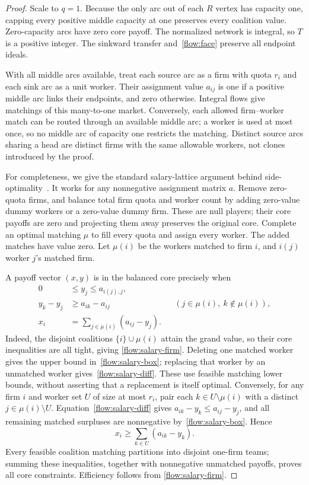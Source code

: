 \begin{proof}
Scale to $q=1$. Because the only arc out of each $R$ vertex has capacity
one, capping every positive middle capacity at one preserves every
coalition value. Zero-capacity arcs have zero core payoff. The normalized
network is integral, so $T$ is a positive integer. The sinkward transfer
and~\eqref{flow:face} preserve all endpoint ideals.

With all middle arcs available, treat each source arc as a firm with
quota $r_i$ and each sink arc as a unit worker. Their assignment value
$a_{ij}$ is one if a positive middle arc links their endpoints, and zero
otherwise. Integral flows give matchings of this many-to-one market.
Conversely, each allowed firm--worker match can be routed through an
available middle arc; a worker is used at most once, so no middle arc
of capacity one restricts the matching. Distinct source arcs sharing a
head are distinct firms with the same allowable workers, not clones
introduced by the proof.

For completeness, we give the standard salary-lattice argument behind
side-optimality~\cite{flow:AtayNunezSolymosi2026}. It works for any
nonnegative assignment matrix $a$. Remove zero-quota firms, and balance
total firm quota and worker count by adding zero-value dummy workers
or a zero-value dummy firm. These are null players; their core payoffs
are zero and projecting them away preserves the original core. Complete
an optimal matching $\mu$ to fill every quota and assign every worker.
The added matches have value zero. Let $\mu(i)$ be the workers matched
to firm $i$, and $i(j)$ worker $j$'s matched firm.

A payoff vector $(x,y)$ is in the balanced core precisely when
\begin{align}
 0&\le y_j\le a_{i(j),j},\label{flow:salary-box}\\
 y_k-y_j&\ge a_{ik}-a_{ij}
         &&(j\in\mu(i),\ k\notin\mu(i)),\label{flow:salary-diff}\\
 x_i&=\sum_{j\in\mu(i)}(a_{ij}-y_j).\label{flow:salary-firm}
\end{align}
Indeed, the disjoint coalitions $\{i\}\cup\mu(i)$ attain the grand
value, so their core inequalities are all tight, giving
\eqref{flow:salary-firm}. Deleting one matched worker gives the upper
bound in~\eqref{flow:salary-box}; replacing that worker by an unmatched
worker gives~\eqref{flow:salary-diff}. These use feasible matching
lower bounds, without asserting that a replacement is itself optimal.
Conversely, for any firm $i$ and worker set $U$ of size at most $r_i$,
pair each $k\in U\setminus\mu(i)$ with a distinct
$j\in\mu(i)\setminus U$. Equation~\eqref{flow:salary-diff} gives
$a_{ik}-y_k\le a_{ij}-y_j$, and all remaining matched surpluses are
nonnegative by~\eqref{flow:salary-box}. Hence
\[
                   x_i\ge\sum_{k\in U}(a_{ik}-y_k).
\]
Every feasible coalition matching partitions into disjoint one-firm
teams; summing these inequalities, together with nonnegative unmatched
payoffs, proves all core constraints. Efficiency follows from
\eqref{flow:salary-firm}.


\end{proof}
